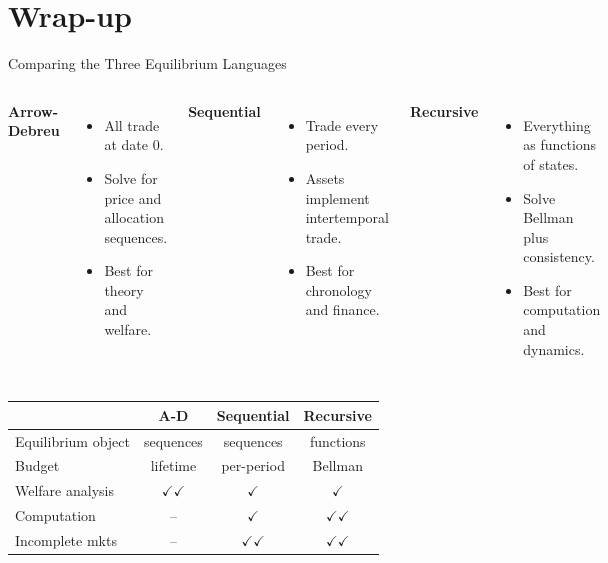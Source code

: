 \documentclass[aspectratio=169,10pt]{beamer}
\begin{document}
\section{Wrap-up}

\begin{frame}{Comparing the Three Equilibrium Languages}
\begin{columns}[T]
\textbf{Arrow-Debreu}
\begin{itemize}
  \item All trade at date 0.
  \item Solve for price and allocation sequences.
  \item Best for theory and welfare.
\end{itemize}

\textbf{Sequential}
\begin{itemize}
  \item Trade every period.
  \item Assets implement intertemporal trade.
  \item Best for chronology and finance.
\end{itemize}

\textbf{Recursive}
\begin{itemize}
  \item Everything as functions of states.
  \item Solve Bellman plus consistency.
  \item Best for computation and dynamics.
\end{itemize}
\end{columns}

\medskip
\begin{center}
\begin{tabular}{lccc}
\toprule
& \textbf{A-D} & \textbf{Sequential} & \textbf{Recursive} \\
\midrule
Equilibrium object & sequences & sequences & functions \\
Budget & lifetime & per-period & Bellman \\
Welfare analysis & $\checkmark\checkmark$ & $\checkmark$ & $\checkmark$ \\
Computation & -- & $\checkmark$ & $\checkmark\checkmark$ \\
Incomplete mkts & -- & $\checkmark\checkmark$ & $\checkmark\checkmark$ \\
\bottomrule
\end{tabular}
\end{center}
\end{frame}
\end{document}
